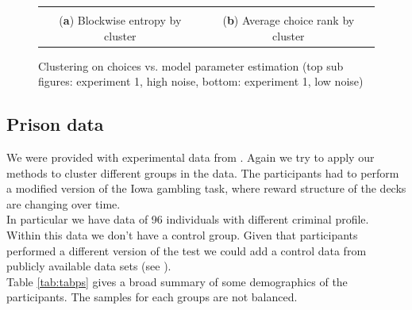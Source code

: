 \documentclass[12pt,a4paper,bibliography=totocnumbered,listof=totocnumbered]{scrartcl}
\begin{document}
\begin{figure}[H]
	\centering
	\small
	\hspace*{-0.7in}
	\begin{tabular}{cc}
		 &  \\
		(\textbf{a}) Blockwise entropy by cluster & (\textbf{b}) Average choice rank by cluster \\
	\end{tabular} \quad
	\caption{Clustering on choices vs. model parameter estimation (top sub figures: experiment 1, high noise, bottom: experiment 1, low noise)}
	\label{fig:cluse1c3}
\end{figure}



\subsection{Prison data}

We were provided with experimental data from \cite{Yechiam2008}. Again we try to apply our methods to cluster different groups in the data. The participants had to perform a modified version of the Iowa gambling task, where reward structure of the decks are changing over time.\\
In particular we have data of 96 individuals with different criminal profile. Within this data we don't have a control group. Given that participants performed a different version of the test we could add a control data from publicly available data sets (see \cite{Steingroever2015}).\\
Table \ref{tab:tabps} gives a broad summary of some demographics of the participants. The samples for each groups are not balanced. 
\end{document}
